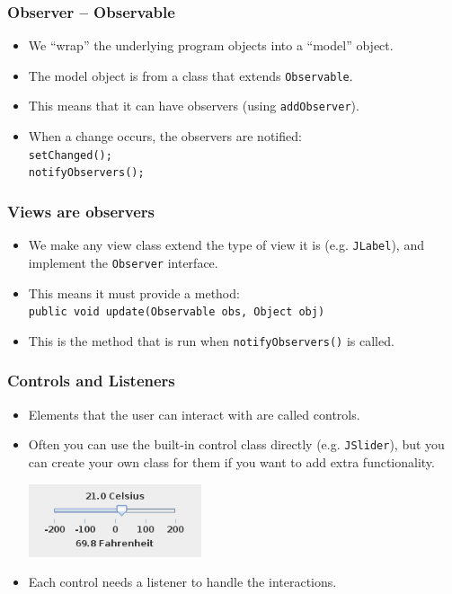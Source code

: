 \documentclass{beamer}
\begin{document}
\begin{frame}
\frametitle{Observer -- Observable}
\begin{itemize}
\item We ``wrap'' the underlying program objects into a ``model''
  object.
\item The model object is from a class that extends \texttt{Observable}.
\item This means that it can have observers (using \texttt{addObserver}).
\item When a change occurs, the observers are notified:\\
\texttt{setChanged();}\\
\texttt{notifyObservers();}
\end{itemize}
\end{frame}

\begin{frame}
  \frametitle{Views are observers}
\begin{itemize}
\item We make any view class extend the type of view it is (e.g.
  \texttt{JLabel}), and implement the \texttt{Observer} interface.

\item This means it must provide a method:\\
  \texttt{public void update(Observable obs, Object obj)}
	  
\item This is the method that is run when \texttt{notifyObservers()} is
  called.
\end{itemize}
\end{frame}

\begin{frame}
  \frametitle{Controls and Listeners}
\begin{itemize}
\item Elements that the user can interact with are called controls.
\item Often you can use the built-in control class directly (e.g.
  \texttt{JSlider}), but you can create your own class for them if you
  want to add extra functionality.
\begin{center}
\includegraphics[width=0.4\textwidth]{./slider.png}
\end{center}
\item Each control needs a listener to handle the interactions.
\end{itemize}
\end{frame}
\end{document}
